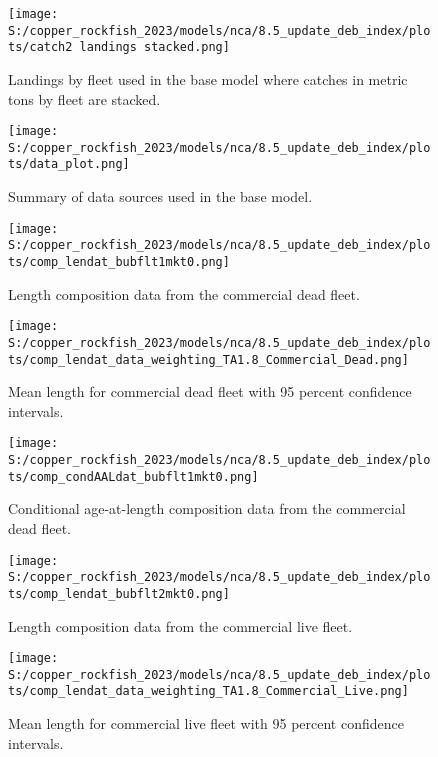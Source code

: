\documentclass[11pt,
  english,
  letterpaper,
]{article}
\begin{document}
\begin{figure}
\centering
\texttt{[image: S:/copper\_rockfish\_2023/models/nca/8.5\_update\_deb\_index/plots/catch2 landings stacked.png]}
\caption{Landings by fleet used in the base model where catches in metric tons by fleet are stacked.\label{fig:catch}}
\end{figure}

\begin{figure}
\centering
\texttt{[image: S:/copper\_rockfish\_2023/models/nca/8.5\_update\_deb\_index/plots/data\_plot.png]}
\caption{Summary of data sources used in the base model.\label{fig:data-plot}}
\end{figure}

\begin{figure}
\centering
\texttt{[image: S:/copper\_rockfish\_2023/models/nca/8.5\_update\_deb\_index/plots/comp\_lendat\_bubflt1mkt0.png]}
\caption{Length composition data from the commercial dead fleet.\label{fig:com-dead-len-data}}
\end{figure}

\begin{figure}
\centering
\texttt{[image: S:/copper\_rockfish\_2023/models/nca/8.5\_update\_deb\_index/plots/comp\_lendat\_data\_weighting\_TA1.8\_Commercial\_Dead.png]}
\caption{Mean length for commercial dead fleet with 95 percent confidence intervals.\label{fig:mean-com-dead-len-data}}
\end{figure}

\begin{figure}
\centering
\texttt{[image: S:/copper\_rockfish\_2023/models/nca/8.5\_update\_deb\_index/plots/comp\_condAALdat\_bubflt1mkt0.png]}
\caption{Conditional age-at-length composition data from the commercial dead fleet.\label{fig:com-dead-age-data}}
\end{figure}

\begin{figure}
\centering
\texttt{[image: S:/copper\_rockfish\_2023/models/nca/8.5\_update\_deb\_index/plots/comp\_lendat\_bubflt2mkt0.png]}
\caption{Length composition data from the commercial live fleet.\label{fig:com-live-len-data}}
\end{figure}

\begin{figure}
\centering
\texttt{[image: S:/copper\_rockfish\_2023/models/nca/8.5\_update\_deb\_index/plots/comp\_lendat\_data\_weighting\_TA1.8\_Commercial\_Live.png]}
\caption{Mean length for commercial live fleet with 95 percent confidence intervals.\label{fig:mean-com-live-len-data}}
\end{figure}
\end{document}
